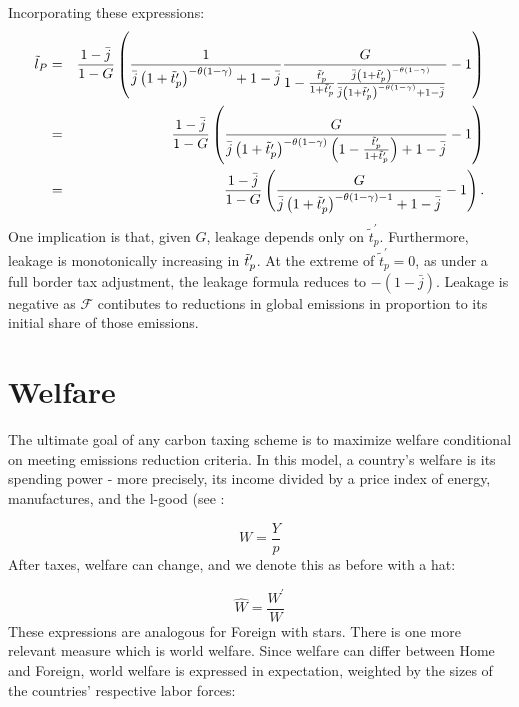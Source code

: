 \documentclass[notitlepage,12pt]{article}
\begin{document}
Incorporating these expressions:%
\begin{eqnarray*}
\tilde{l}_{P} &=&\frac{1-\bar{j}}{1-G}\left( \frac{1}{\bar{j}\left( 1+\tilde{%
t}_{p}^{\prime }\right) ^{-\theta \left( 1-\gamma \right) }+1-\bar{j}}\frac{G%
}{1-\frac{\tilde{t}_{p}^{\prime }}{1+\tilde{t}_{p}^{\prime }}\frac{\bar{j}%
\left( 1+\tilde{t}_{p}^{\prime }\right) ^{-\theta \left( 1-\gamma \right) }}{%
\bar{j}\left( 1+\tilde{t}_{p}^{\prime }\right) ^{-\theta \left( 1-\gamma
\right) }+1-\bar{j}}}-1\right)  \\
&=&\frac{1-\bar{j}}{1-G}\left( \frac{G}{\bar{j}\left( 1+\tilde{t}%
_{p}^{\prime }\right) ^{-\theta \left( 1-\gamma \right) }\left( 1-\frac{%
\tilde{t}_{p}^{\prime }}{1+\tilde{t}_{p}^{\prime }}\right) +1-\bar{j}}%
-1\right)  \\
&=&\frac{1-\bar{j}}{1-G}\left( \frac{G}{\bar{j}\left( 1+\tilde{t}%
_{p}^{\prime }\right) ^{-\theta \left( 1-\gamma \right) -1}+1-\bar{j}}%
-1\right) .
\end{eqnarray*}%
One implication is that, given $G$, leakage depends only on $\tilde{t}%
_{p}^{\prime }$. Furthermore, leakage is monotonically increasing in $\tilde{%
t}_{p}^{\prime }$. At the extreme of $\tilde{t}_{p}^{\prime }=0$, as under a
full border tax adjustment, the leakage formula reduces to $-\left( 1-\bar{j}%
\right) $. Leakage is negative as $\mathcal{F}$ contibutes to reductions in
global emissions in proportion to its initial share of those emissions.

\section{Welfare}

The ultimate goal of any carbon taxing scheme is to maximize welfare conditional on meeting emissions reduction criteria. In this model, a country's welfare is its spending power - more precisely, its income divided by a price index of energy, manufactures, and the l-good (see :

\begin{equation*}
W = \frac{Y}{p}
\end{equation*}
After taxes, welfare can change, and we denote this as before with a hat:

\begin{equation*}
\hat{W} = \frac{W^\prime}{W}
\end{equation*}
These expressions are analogous for Foreign with stars. There is one more relevant measure which is world welfare. Since welfare can differ between Home and Foreign, world welfare is expressed in expectation, weighted by the sizes of the countries' respective labor forces:
\end{document}
